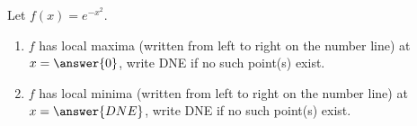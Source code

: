 \documentclass{ximera}
\author{Gregory Hartman \and Matthew Carr}
\begin{document}
\begin{exercise}






Let $f(x)=e^{-x^2}$.
\begin{enumerate}
\item		$f$ has local maxima (written from left to right on the number line) at $x=\answer{0}$, write DNE if no such point(s) exist.
\item		$f$ has local minima (written from left to right on the number line) at $x=\answer{DNE}$, write DNE if no such point(s) exist.
\end{enumerate}

\end{exercise}
\end{document}
